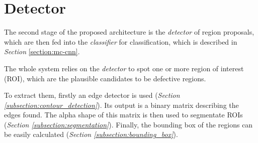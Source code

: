 \section{Detector}\label{section:region_proposals}
    \par{
        The second stage of the proposed architecture is the \emph{detector} of region proposals, which are then fed into the \emph{classifier} for classification, which is described in \emph{Section} \ref{section:mc-cnn}.
    }
    \par{
        The whole system relies on the \emph{detector} to spot one or more region of interest (ROI), which are the plausible candidates to be defective regions.
    }
    \par{
        To extract them, firstly an edge detector is used (\emph{Section \ref{subsection:contour_detection}}). Its output is a binary matrix describing the edges found. The alpha shape of this matrix is then used to segmentate ROIs (\emph{Section \ref{subsection:segmentation}}). Finally, the bounding box of the regions can be easily calculated (\emph{Section \ref{subsection:bounding_box}}).
    }
